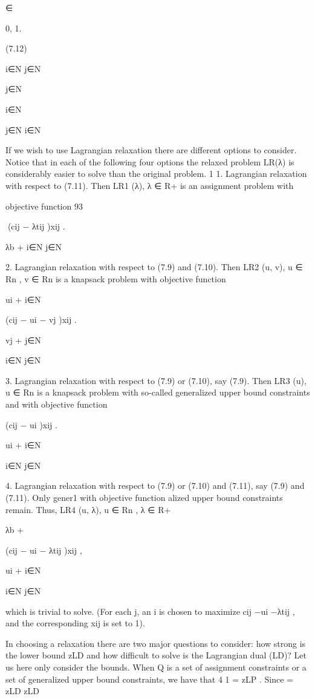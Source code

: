 ∈

{0, 1}.

(7.12)

i∈N j∈N

j∈N

i∈N

j∈N i∈N

If we wish to use Lagrangian relaxation there are different options to consider. Notice that in each of
the following four options the relaxed problem LR(λ) is considerably easier to solve than the original
problem.
1
1. Lagrangian relaxation with respect to (7.11). Then LR1 (λ), λ ∈ R+
is an assignment problem with

objective function
93

(cij − λtij )xij .

λb +
i∈N j∈N

2. Lagrangian relaxation with respect to (7.9) and (7.10). Then LR2 (u, v), u ∈ Rn , v ∈ Rn is a
knapsack problem with objective function

ui +
i∈N

(cij − ui − vj )xij .

vj +
j∈N

i∈N j∈N

3. Lagrangian relaxation with respect to (7.9) or (7.10), say (7.9). Then LR3 (u), u ∈ Rn is a knapsack
problem with so-called generalized upper bound constraints and with objective function

(cij − ui )xij .

ui +
i∈N

i∈N j∈N

4. Lagrangian relaxation with respect to (7.9) or (7.10) and (7.11), say (7.9) and (7.11). Only gener1
with objective function
alized upper bound constraints remain. Thus, LR4 (u, λ), u ∈ Rn , λ ∈ R+

λb +

(cij − ui − λtij )xij ,

ui +
i∈N

i∈N j∈N

which is trivial to solve. (For each j, an i is chosen to maximize cij −ui −λtij , and the corresponding
xij is set to 1).

In choosing a relaxation there are two major questions to consider: how strong is the lower bound zLD
and how difficult to solve is the Lagrangian dual (LD)? Let us here only consider the bounds.
When Q is a set of assignment constraints or a set of generalized upper bound constraints, we have that
4
1
= zLP . Since
= zLD
zLD

